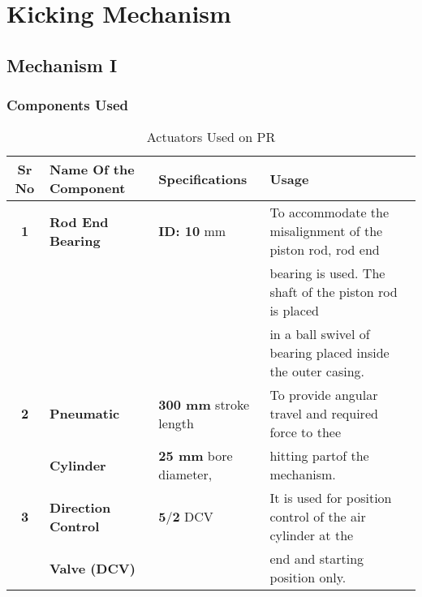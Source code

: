 
\section{Kicking Mechanism}

    \subsection{Mechanism I}

        \subsubsection{Components Used}
        \begin{table}[h]
            \caption {Actuators Used on PR} \label{Actuators_K}  \small
            \begin{tabular}{|c|l|l|l|}
                \hline  \hline
                \textbf{Sr No}  & \textbf{Name Of the Component}& \textbf{Specifications}               & \textbf{Usage}                                                   \\ \hline    \hline
                \textbf{1}      & \textbf{Rod End Bearing}      & \textbf{ID: 10 }mm                    & To accommodate the misalignment of the piston rod, rod end       \\
                                &                               &                                       & bearing is used. The shaft of the piston rod is placed           \\ 
                                &                               &                                       & in a ball swivel of bearing placed inside the outer casing.      \\ \hline
                \textbf{2}      & \textbf{Pneumatic }           & \textbf{300 mm} stroke length         & To provide angular travel and required force to thee             \\
                                & \textbf{Cylinder}             & \textbf{25 mm} bore diameter,         & hitting partof the mechanism.                                    \\ \hline 
                \textbf{3}      & \textbf{Direction Control}    & $\textbf{5/2}$ DCV                    & It is used for position control of the air cylinder at the       \\
                                & \textbf{Valve (DCV)}          &                                       & end and starting position only.                                  \\ \hline    \hline   
            \end{tabular}
        \end{table}

